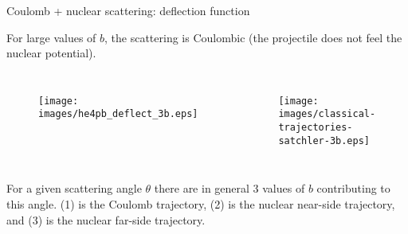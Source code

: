 \documentclass[english,10pt]{beamer}
\newcommand{\images}{images}
\begin{document}
\begin{frame}{ Coulomb + nuclear scattering: deflection function}


 For large values of {\verde $b$}, the scattering is Coulombic (the projectile does not feel the nuclear potential). 


\begin{columns}[t]

\begin{figure}{\par \resizebox*{1.0\textwidth}{!}
{\texttt{[image: \\images/he4pb\_deflect\_3b.eps]}} \par}
\end{figure}
%
\begin{figure}{\par \resizebox*{1.0\textwidth}{!}
{\texttt{[image: \\images/classical-trajectories-satchler-3b.eps]}} \par}
\end{figure}
\end{columns}%

{} For a given scattering angle $\theta$ there are in general 3 values of $b$ contributing to this angle. (1) is the Coulomb trajectory, (2) is the nuclear near-side trajectory, and (3) is the nuclear far-side trajectory.

\end{frame}
\end{document}
